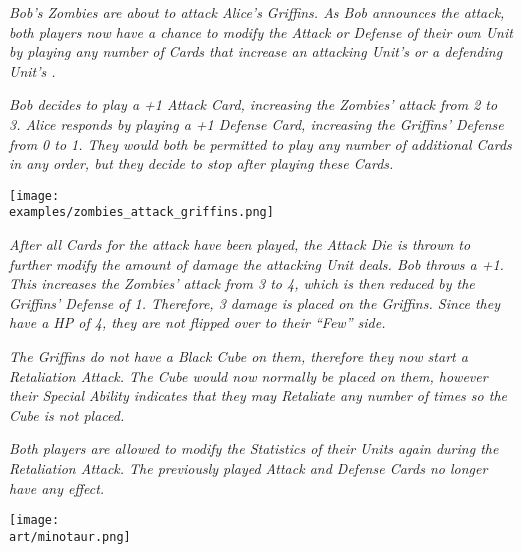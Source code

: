 \begin{multicols*}{2}
\textit{Bob's Zombies are about to attack Alice's Griffins.
As Bob announces the attack, both players now have a chance to modify the Attack or Defense of their own Unit by playing any number of  Cards that increase an attacking Unit's  or a defending Unit's .}\par
\textit{Bob decides to play a +1 Attack Card, increasing the Zombies' attack from 2 to 3.
Alice responds by playing a +1 Defense Card, increasing the Griffins' Defense from 0 to 1.
They would both be permitted to play any number of additional Cards in any order, but they decide to stop after playing these Cards.}\par

\texttt{[image: \\examples/zombies\_attack\_griffins.png]}

\textit{After all Cards for the attack have been played, the Attack Die is thrown to further modify the amount of damage the attacking Unit deals.
Bob throws a +1.
This increases the Zombies' attack from 3 to 4, which is then reduced by the Griffins' Defense of 1. Therefore, 3 damage  is placed on the Griffins. Since they have a HP  of 4, they are not flipped over to their ``Few'' side.}\par
\textit{The Griffins do not have a Black Cube on them, therefore they now start a Retaliation Attack.
The Cube would now normally be placed on them, however their Special  Ability indicates that they may Retaliate any number of times so the Cube is not placed.}\par
\textit{Both players are allowed to modify the Statistics of their Units again during the Retaliation Attack.
The previously played Attack and Defense Cards no longer have any effect.}

\vfill

{\hspace{-1em}\texttt{[image: \\art/minotaur.png]}}

\end{multicols*}

\clearpage

